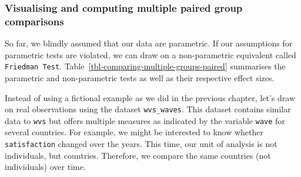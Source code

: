 \documentclass[
  letterpaper,
]{krantz}
\begin{document}
\subsubsection{Visualising and computing multiple paired group
comparisons}\label{sec-visualising-computing-multiple-paired-group-comparisons}

So far, we blindly assumed that our data are parametric. If our
assumptions for parametric tests are violated, we can draw on a
non-parametric equivalent called \texttt{Friedman\ Test}.
Table~\ref{tbl-comparing-multiple-groups-paired} summarises the
parametric and non-parametric tests as well as their respective effect
sizes.

\begin{table}

\caption{\label{tbl-comparing-multiple-groups-paired}Comparing multiple
paired groups (effect size functions from package \texttt{effectsize}}


\end{table}%

Instead of using a fictional example as we did in the previous chapter,
let's draw on real observations using the dataset \texttt{wvs\_waves}.
This dataset contains similar data to \texttt{wvs} but offers multiple
measures as indicated by the variable \texttt{wave} for several
countries. For example, we might be interested to know whether
\texttt{satisfaction} changed over the years. This time, our unit of
analysis is not individuals, but countries. Therefore, we compare the
same countries (not individuals) over time.
\end{document}
